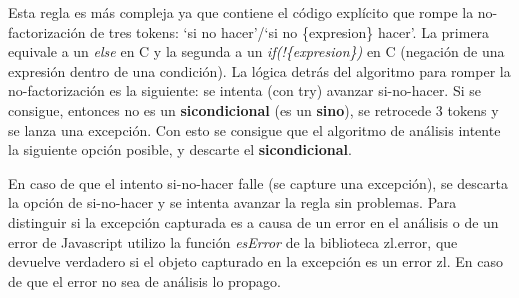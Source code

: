 \documentclass{report}
\begin{document}
	Esta regla es más compleja ya que contiene el código explícito que rompe la no-factorización de tres tokens: `si no hacer'/`si no \{expresion\} hacer'. La primera equivale a un \textit{else} en C y la segunda a un \textit{if(!\{expresion\})} en C (negación de una expresión dentro de una condición). La lógica detrás del algoritmo para romper la no-factorización es la siguiente: se intenta (con try) avanzar si-no-hacer. Si se consigue, entonces no es un \textbf{sicondicional} (es un \textbf{sino}), se retrocede 3 tokens y se lanza una excepción. Con esto se consigue que el algoritmo de análisis intente la siguiente opción posible, y descarte el \textbf{sicondicional}. 
	
	\vspace{10px}
	
	En caso de que el intento si-no-hacer falle (se capture una excepción), se descarta la opción de si-no-hacer y se intenta avanzar la regla sin problemas. Para distinguir si la excepción capturada es a causa de un error en el análisis o de un error de Javascript utilizo la función \textit{esError} de la biblioteca zl.error, que devuelve verdadero si el objeto capturado en la excepción es un error zl. En caso de que el error no sea de análisis lo propago.
	
	\vspace{10px}
	
\end{document}
